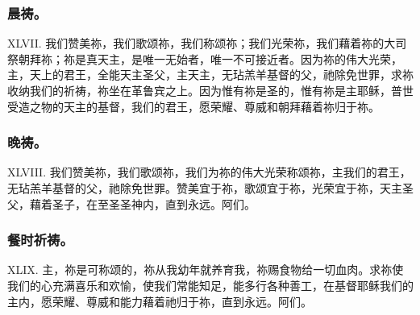 
\subsubsection{晨祷。}

XLVII.   我们赞美祢，我们歌颂祢，我们称颂祢；我们光荣祢，我们藉着祢的大司祭朝拜祢；祢是真天主，是唯一无始者，唯一不可接近者。因为祢的伟大光荣，主，天上的君王，全能天主圣父，主天主，无玷羔羊基督的父，祂除免世罪，求祢收纳我们的祈祷，祢坐在革鲁宾之上。因为惟有祢是圣的，惟有祢是主耶稣，普世受造之物的天主的基督，我们的君王，愿荣耀、尊威和朝拜藉着祢归于祢。\par


\subsubsection{晚祷。}

XLVIII.  我们赞美祢，我们歌颂祢，我们为祢的伟大光荣称颂祢，主我们的君王，无玷羔羊基督的父，祂除免世罪。赞美宜于祢，歌颂宜于祢，光荣宜于祢，天主圣父，藉着圣子，在至圣圣神内，直到永远。阿们。\par


\subsubsection{餐时祈祷。}

XLIX. 主，祢是可称颂的，祢从我幼年就养育我，祢赐食物给一切血肉。求祢使我们的心充满喜乐和欢愉，使我们常能知足，能多行各种善工，在基督耶稣我们的主内，愿荣耀、尊威和能力藉着祂归于祢，直到永远。阿们。\par

